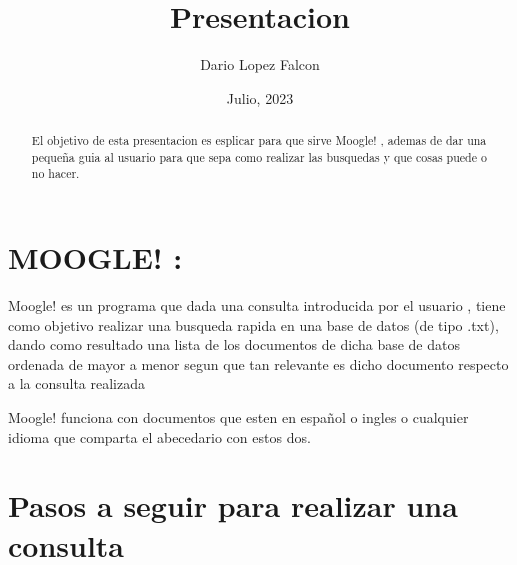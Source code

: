 \documentclass[a4paper,12pt]{article}
\begin{document}
\title{Presentacion}
\author{Dario Lopez Falcon}
\date{Julio, 2023}
\maketitle

\begin{abstract}
   El objetivo de esta presentacion es esplicar para que sirve Moogle! , ademas de dar una 
   pequeña guia al usuario para que sepa como realizar las busquedas y que cosas puede o no hacer.  
\end{abstract}

\section{MOOGLE! :}\label{sec:intro}

Moogle! es un programa que dada una consulta introducida por el usuario , tiene como objetivo realizar 
una busqueda rapida en una base de datos (de tipo .txt), dando como resultado una lista de los documentos 
de dicha base de datos ordenada de  mayor a menor segun que tan relevante es dicho documento respecto a la 
consulta realizada

Moogle! funciona con documentos que esten en español o ingles o cualquier idioma que comparta el abecedario 
con estos dos.

\section{Pasos a seguir para realizar una consulta}\label{sec:ps}
\end{document}
